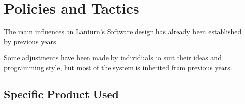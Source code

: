 \section{Policies and Tactics}
\label{sec:policies}

The main influences on Lanturn’s Software design has already been established
by previous years. 
\par

Some adjustments have been made by individuals to suit their ideas and
programming style, but most of the system is inherited from previous years.
\par

\subsection{Specific Product Used}
\label{sec:specific}

